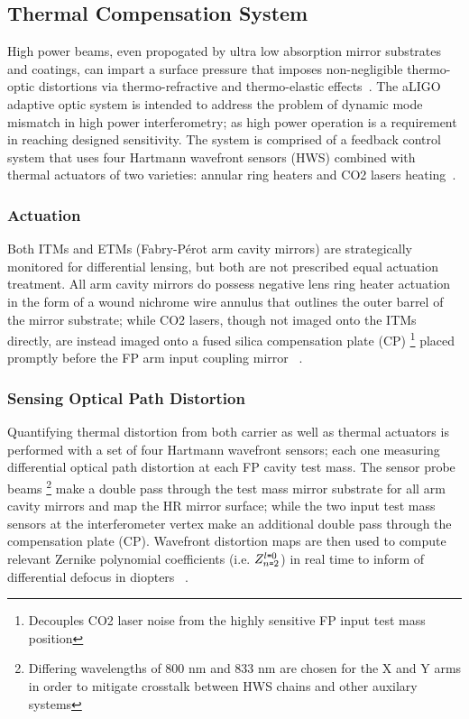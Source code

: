 \subsection{Thermal Compensation System}
High power beams, even propogated by ultra low absorption mirror substrates and coatings, can impart a surface pressure that imposes non-negligible thermo-optic distortions via thermo-refractive and thermo-elastic effects~\cite{hellovinet:1990}. The aLIGO adaptive optic system is intended to address the problem of dynamic mode mismatch in high power interferometry; as high power operation is a requirement in reaching designed sensitivity. The system is comprised of a feedback control system that uses four Hartmann wavefront sensors (HWS) combined with thermal actuators of two varieties: annular ring heaters and CO2 lasers heating~\cite{brooks:16, diss:brooks}.  

\subsubsection{Actuation}
Both ITMs and ETMs (Fabry-P\'{e}rot arm cavity mirrors) are strategically monitored for differential lensing, but both are not prescribed equal actuation treatment. All arm cavity mirrors do possess negative lens ring heater actuation in the form of a wound nichrome wire annulus that outlines the outer barrel of the mirror substrate; while CO2 lasers, though not imaged onto the ITMs directly, are instead imaged onto a fused silica compensation plate (CP) \footnote{Decouples CO2 laser noise from the highly sensitive FP input test mass position} placed promptly before the FP arm input coupling mirror ~\cite{brooks:aigwd2019}.

\subsubsection{Sensing Optical Path Distortion}
Quantifying thermal distortion from both carrier as well as thermal actuators is performed with a set of four Hartmann wavefront sensors; each one measuring differential optical path distortion at each FP cavity test mass. The sensor probe beams \footnote{Differing wavelengths of 800 nm and 833 nm are chosen for the X and Y arms in order to mitigate crosstalk between HWS chains and other auxilary systems} make a double pass through the test mass mirror substrate for all arm cavity mirrors and map the HR mirror surface; while the two input test mass sensors at the interferometer vertex make an additional double pass through the compensation plate (CP). Wavefront distortion maps are then used to compute relevant Zernike polynomial coefficients (i.e. $Z^{l \texttt{=} 0}_{n \texttt{=} 2}$) in real time to inform of differential defocus in diopters ~\cite{aasi:2015}.



